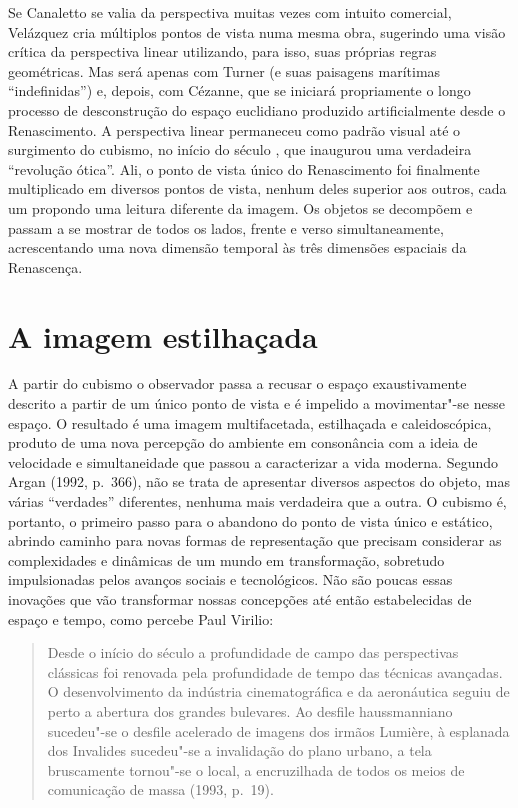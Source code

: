 Se Canaletto se valia da perspectiva muitas vezes com intuito comercial,
Velázquez cria múltiplos pontos de vista numa mesma obra, sugerindo uma
visão crítica da perspectiva linear utilizando, para isso, suas próprias
regras geométricas. Mas será apenas com Turner (e suas paisagens
marítimas ``indefinidas'') e, depois, com Cézanne, que se iniciará
propriamente o longo processo de desconstrução do espaço euclidiano
produzido artificialmente desde o Renascimento. A perspectiva linear
permaneceu como padrão visual até o surgimento do cubismo, no início do
século , que inaugurou uma verdadeira ``revolução ótica''. Ali, o
ponto de vista único do Renascimento foi finalmente multiplicado em
diversos pontos de vista, nenhum deles superior aos outros, cada um
propondo uma leitura diferente da imagem. Os objetos se decompõem e
passam a se mostrar de todos os lados, frente e verso simultaneamente,
acrescentando uma nova dimensão temporal às três dimensões espaciais da
Renascença.

\chapter{A imagem estilhaçada}

A partir do cubismo o observador passa a recusar o espaço
exaustivamente descrito a partir de um único ponto de vista e é impelido
a movimentar"-se nesse espaço. O resultado é uma imagem multifacetada,
estilhaçada e caleidoscópica, produto de uma nova percepção do ambiente
em consonância com a ideia de velocidade e simultaneidade que passou a
caracterizar a vida moderna. Segundo Argan (1992, p.~366), não se trata
de apresentar diversos aspectos do objeto, mas várias ``verdades''
diferentes, nenhuma mais verdadeira que a outra. O cubismo é, portanto,
o primeiro passo para o abandono do ponto de vista único e estático,
abrindo caminho para novas formas de representação que precisam
considerar as complexidades e dinâmicas de um mundo em transformação,
sobretudo impulsionadas pelos avanços sociais e tecnológicos. Não são
poucas essas inovações que vão transformar nossas concepções até então
estabelecidas de espaço e tempo, como percebe Paul Virilio:

\begin{quote}
Desde o início do século  a profundidade de campo das perspectivas
clássicas foi renovada pela profundidade de tempo das técnicas
avançadas. O desenvolvimento da indústria cinematográfica e da
aeronáutica seguiu de perto a abertura dos grandes bulevares. Ao desfile
haussmanniano sucedeu"-se o desfile acelerado de imagens dos irmãos
Lumière, à esplanada dos Invalides sucedeu"-se a invalidação do plano
urbano, a tela bruscamente tornou"-se o local, a encruzilhada de todos os
meios de comunicação de massa (1993, p.~19).
\end{quote}

